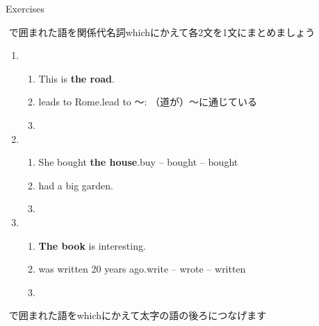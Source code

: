 \documentclass[aspectratio=169,xcolor={dvipsnames,table}]{beamer}
\begin{document}
\begin{frame}[plain,t]{Exercises}

{\small \fbox{　　}\,\,で囲まれた語を関係代名詞whichにかえて各2文を1文にまとめましょう}%
\hfill{\scriptsize {}}

\begin{enumerate}
 \item \begin{enumerate}
	\item This is {\bfseries the road}.
	\item {} leads to Rome.\hfill{\scriptsize lead to ～: （道が）～に通じている}
	\item {}
       \end{enumerate}
 \item \begin{enumerate}
	\item She bought {\bfseries the house}.\hfill{\scriptsize buy -- bought -- bought}
	\item {} had a big garden.
	\item {}
       \end{enumerate}
 \item \begin{enumerate}
	\item {\bfseries The book} is interesting.
	\item {} was written 20 years ago.\hfill{\scriptsize write -- wrote -- written}
	\item {}
       \end{enumerate}
\end{enumerate} 

\hfill{\small \fbox{　　}\,\,で囲まれた語をwhichにかえて太字の語の後ろにつなげます}%
\end{frame}
\end{document}

